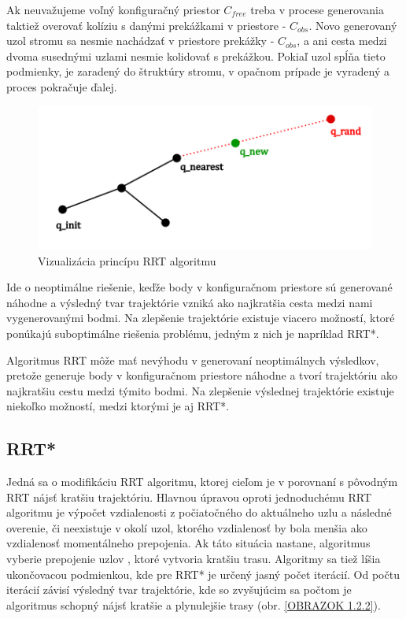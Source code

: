 Ak neuvažujeme voľný konfiguračný priestor $C_{free}$ treba v procese generovania taktiež overovať kolíziu s danými prekážkami v priestore - $C_{obs}$. Novo generovaný uzol stromu sa nesmie nachádzať v priestore prekážky - $C_{obs}$, a ani cesta medzi dvoma susednými uzlami nesmie kolidovať s prekážkou. Pokiaľ uzol spĺňa tieto podmienky, je zaradený do štruktúry stromu, v opačnom prípade je vyradený a proces pokračuje ďalej.

\begin{figure}[h]
	\centering
	\includegraphics[width=120mm]{img/RRT1.png}
	\caption{Vizualizácia princípu RRT algoritmu }\label{OBRAZOK 2.1} 
\end{figure}  

Ide o neoptimálne riešenie, keďže body v konfiguračnom priestore sú generované náhodne a výsledný tvar trajektórie vzniká ako najkratšia cesta medzi nami vygenerovanými bodmi. Na zlepšenie trajektórie existuje viacero možností, ktoré ponúkajú suboptimálne riešenia problému, jedným z nich je napríklad RRT*.  


Algoritmus RRT môže mať nevýhodu v generovaní neoptimálnych výsledkov, pretože generuje body v konfiguračnom priestore náhodne a tvorí trajektóriu ako najkratšiu cestu medzi týmito bodmi. Na zlepšenie výslednej trajektórie existuje niekoľko možností, medzi ktorými je aj RRT*.

\subsection{RRT*}
\label{kap:2.2}

Jedná sa o modifikáciu RRT algoritmu, ktorej cieľom je v porovnaní s pôvodným RRT nájsť kratšiu trajektóriu. Hlavnou úpravou oproti jednoduchému RRT algoritmu je výpočet vzdialenosti z počiatočného do aktuálneho uzlu a následné overenie, či neexistuje v okolí uzol, ktorého vzdialenosť by bola menšia ako vzdialenosť momentálneho prepojenia. Ak táto situácia nastane, algoritmus vyberie prepojenie uzlov , ktoré vytvoria kratšiu trasu. Algoritmy sa tiež líšia ukončovacou podmienkou, kde pre RRT* je určený jasný počet iterácií. Od počtu iterácií závisí výsledný tvar trajektórie, kde so zvyšujúcim sa počtom je algoritmus schopný nájsť kratšie a plynulejšie trasy (obr. \ref{OBRAZOK 1.2.2}).

